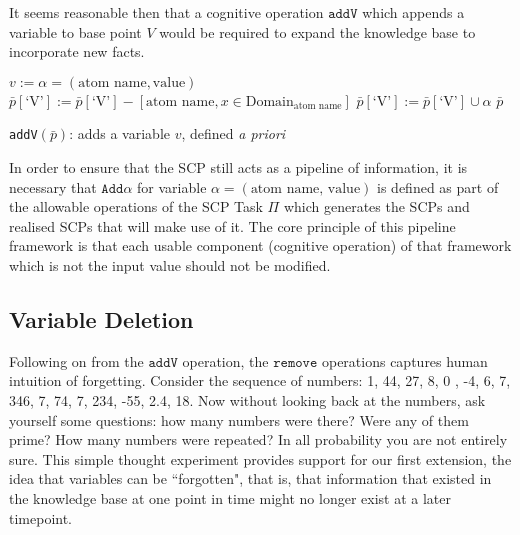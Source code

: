 It seems reasonable then that a cognitive operation $\texttt{addV}$ which appends a variable to base point $V$ would be required to expand the knowledge base to incorporate new facts.

\begin{algorithm}[H] 
\SetAlgoLined
{}
$v:= \alpha=(\text{atom name},\text{value})$\;
{
$\bar{p}[\textrm{`V'}]:=\bar{p}[\textrm{`V'}] - [\text{atom name}, x \in \text{Domain}_\text{atom name}] $
$\bar{p}[\textrm{`V'}]:=\bar{p}[\textrm{`V'}] \cup \alpha$\;
\Return $\bar{p}$
}

\caption{\texttt{addV}$(\bar{p})$: adds a variable $v$, defined \textit{a priori}}
\label{cogOp:addV}
\end{algorithm}

In order to ensure that the SCP still acts as a pipeline of information, it is necessary that $\texttt{Add}\alpha$ for variable $\alpha=(\text{atom name, value})$ is defined as part of the allowable operations of the SCP Task $\Pi$ which generates the SCPs and realised SCPs that will make use of it. The core principle of this pipeline framework is that each usable component (cognitive operation) of that framework which is not the input value should not be modified.

\subsection{Variable Deletion} \label{ssec:deletion}
Following on from the $\texttt{addV}$ operation, the $\texttt{remove}$ operations captures human intuition of forgetting. Consider the sequence of numbers: 1, 44, 27, 8, 0 , -4, 6, 7, 346, 7, 74, 7, 234, -55, 2.4, 18. Now without looking back at the numbers, ask yourself some questions: how many numbers were there? Were any of them prime? How many numbers were repeated? In all probability you are not entirely sure. This simple thought experiment provides support for our first extension, the idea that variables can be ``forgotten", that is, that information that existed in the knowledge base at one point in time might no longer exist at a later timepoint. 


